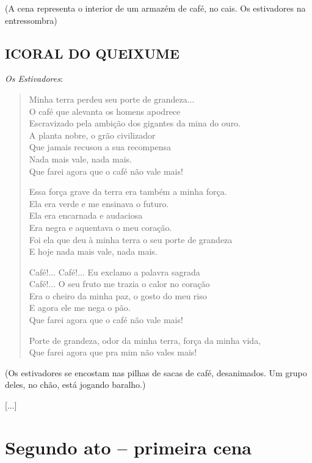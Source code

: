 \hfill\parbox{150pt}{(A cena representa o interior
de um armazém de café, no cais.
Os estivadores na entressombra)}

\section{I\break CORAL DO QUEIXUME}

\emph{Os Estivadores}:

\begin{verse}
Minha terra perdeu seu porte de grandeza...\\
O café que alevanta os homens apodrece\\
Escravizado pela ambição dos gigantes da mina do ouro.\\
A planta nobre, o grão civilizador\\
Que jamais recusou a sua recompensa\\
Nada mais vale, nada mais.\\
Que farei agora que o café não vale mais!

Essa força grave da terra era também a minha força.\\
Ela era verde e me ensinava o futuro.\\
Ela era encarnada e audaciosa\\
Era negra e aquentava o meu coração.\\
Foi ela que deu à minha terra o seu porte de grandeza\\
E hoje nada mais vale, nada mais.

Café!... Café!... Eu exclamo a palavra sagrada\\
Café!... O seu fruto me trazia o calor no coração\\
Era o cheiro da minha paz, o gosto do meu riso\\
E agora ele me nega o pão.\\
Que farei agora que o café não vale mais!

Porte de grandeza, odor da minha terra, força da minha vida,\\
Que farei agora que pra mim não vales mais!
\end{verse}

\hfill\parbox{150pt}{(Os estivadores se encostam nas pilhas
de sacas de café, desanimados. Um grupo
deles, no chão, está jogando baralho.)}

{[}...{]}

\chapter{Segundo ato -- primeira cena}

